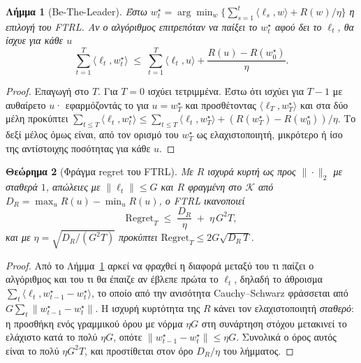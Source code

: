 \documentclass[12pt,a4paper,oneside]{report}
\renewcommand{\_}{\oldunderscore\allowbreak}
\theoremstyle{definition}
\theoremstyle{plain}
\newtheorem{theorem}{Θεώρημα}[chapter]
\newtheorem{lemma}[theorem]{Λήμμα}
\theoremstyle{remark}
\begin{document}
\begin{lemma}[Be-The-Leader]
\label{lem:btl}
Έστω $w^{\star}_t = \arg\min_{w} \{\sum_{s=1}^{t}\langle \ell_s,w\rangle + R(w)/\eta\}$ η
επιλογή του FTRL. Αν ο αλγόριθμος επιτρεπόταν να παίξει το $w^{\star}_t$ \emph{αφού} δει το
$\ell_t$, θα ίσχυε για κάθε $u$
\[
\sum_{t=1}^{T} \langle \ell_t, w^{\star}_t\rangle \;\leq\; \sum_{t=1}^{T} \langle \ell_t, u\rangle
+ \frac{R(u) - R(w^{\star}_0)}{\eta}.
\]
\end{lemma}

\begin{proof}
Επαγωγή στο $T$. Για $T=0$ ισχύει τετριμμένα. Έστω ότι ισχύει για $T-1$ με αυθαίρετο $u$·
εφαρμόζοντάς το για $u = w^{\star}_T$ και προσθέτοντας $\langle \ell_T, w^{\star}_T\rangle$
και στα δύο μέλη προκύπτει
$\sum_{t\leq T}\langle \ell_t,w^{\star}_t\rangle \leq \sum_{t\leq T}\langle \ell_t,
w^{\star}_T\rangle + (R(w^{\star}_T)-R(w^{\star}_0))/\eta$. Το δεξί μέλος όμως είναι, από τον
ορισμό του $w^{\star}_T$ ως ελαχιστοποιητή, μικρότερο ή ίσο της αντίστοιχης ποσότητας για
κάθε $u$.
\end{proof}

\begin{theorem}[Φράγμα regret του FTRL]
\label{thm:ftrl}
Με $R$ ισχυρά κυρτή ως προς $\|\cdot\|_2$ με σταθερά $1$, απώλειες με $\|\ell_t\|\leq G$ και
$R$ φραγμένη στο $\mathcal{K}$ από $D_R = \max_u R(u) - \min_u R(u)$, ο FTRL ικανοποιεί
\[
\mathrm{Regret}_T \;\leq\; \frac{D_R}{\eta} \;+\; \eta\, G^2 T,
\]
και με $\eta = \sqrt{D_R/(G^2T)}$ προκύπτει $\mathrm{Regret}_T \leq 2G\sqrt{D_R\, T}$.
\end{theorem}

\begin{proof}
Από το Λήμμα~\ref{lem:btl} αρκεί να φραχθεί η διαφορά μεταξύ του τι παίζει ο αλγόριθμος και
του τι θα έπαιζε αν έβλεπε πρώτα το $\ell_t$, δηλαδή το άθροισμα
$\sum_t \langle \ell_t, w^{\star}_{t-1} - w^{\star}_t\rangle$, το οποίο από την ανισότητα
Cauchy--Schwarz φράσσεται από $G\sum_t \|w^{\star}_{t-1}-w^{\star}_t\|$. Η ισχυρή κυρτότητα
της $R$ κάνει τον ελαχιστοποιητή \emph{σταθερό}: η προσθήκη ενός γραμμικού όρου με νόρμα
$\eta G$ στη συνάρτηση στόχου μετακινεί το ελάχιστο κατά το πολύ $\eta G$, οπότε
$\|w^{\star}_{t-1}-w^{\star}_t\| \leq \eta G$. Συνολικά ο όρος αυτός είναι το πολύ
$\eta G^2 T$, και προστίθεται στον όρο $D_R/\eta$ του λήμματος.
\end{proof}
\end{document}
